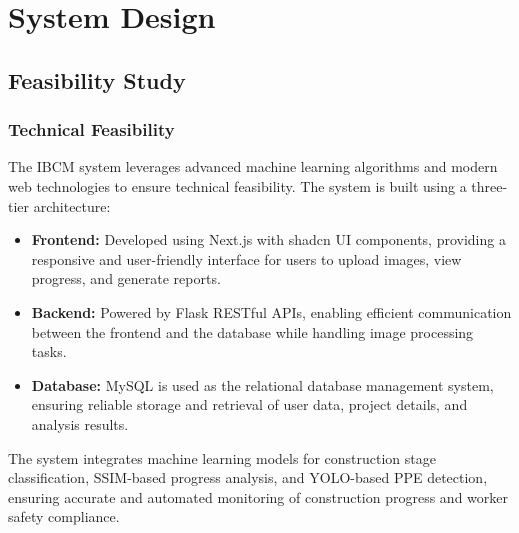 \documentclass[12pt,a4paper]{report}
\begin{document}

\chapter{System Design}

\section{Feasibility Study}

\subsection{Technical Feasibility}
The IBCM system leverages advanced machine learning algorithms and modern web technologies to ensure technical feasibility. The system is built using a three-tier architecture:
\begin{itemize}
    \item \textbf{Frontend:} Developed using Next.js with shadcn UI components, providing a responsive and user-friendly interface for users to upload images, view progress, and generate reports.
    \item \textbf{Backend:} Powered by Flask RESTful APIs, enabling efficient communication between the frontend and the database while handling image processing tasks.
    \item \textbf{Database:} MySQL is used as the relational database management system, ensuring reliable storage and retrieval of user data, project details, and analysis results.
\end{itemize}
The system integrates machine learning models for construction stage classification, SSIM-based progress analysis, and YOLO-based PPE detection, ensuring accurate and automated monitoring of construction progress and worker safety compliance.
\end{document}
